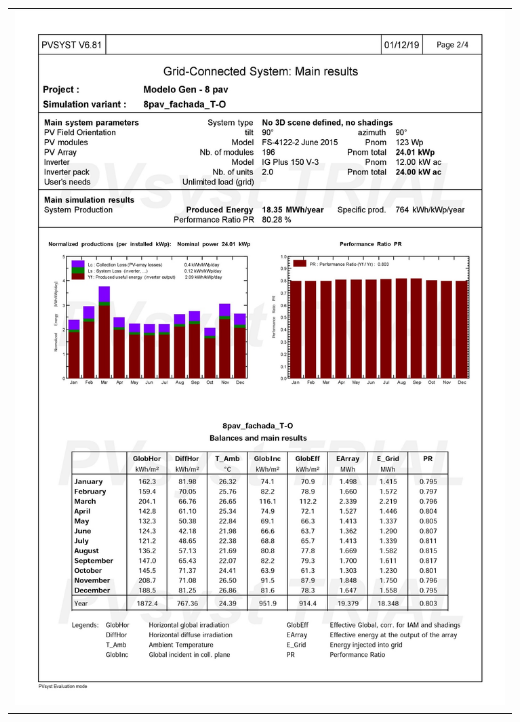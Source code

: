 \begin{table}[H]
    \centering
    \begin{tabular}{l}
        \includegraphics[width=\textwidth]{figures/attachments/resultpv14.jpg}
    \end{tabular}
\end{table}
\pagebreak
